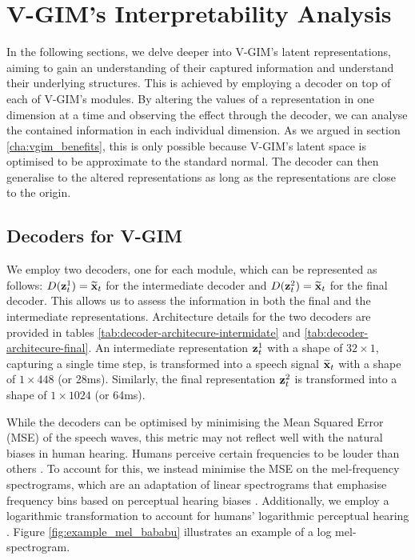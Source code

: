\section{V-GIM's Interpretability Analysis} 
	In the following sections, we delve deeper into V-GIM's latent representations, aiming to gain an understanding of their captured information and understand their underlying structures. This is achieved by employing a decoder on top of each of V-GIM's modules. By altering the values of a representation in one dimension at a time and observing the effect through the decoder, we can analyse the contained information in each individual dimension. As we argued in section \ref{cha:vgim_benefits}, this is only possible because V-GIM's latent space is optimised to be approximate to the standard normal. The decoder can then generalise to the altered representations as long as the representations are close to the origin.
	
	\subsection{Decoders for V-GIM} \label{cha:experiments_interp_analy_decoder}
		We employ two decoders, one for each module, which can be represented as follows: $D(\mathbf{z}_t^1) = \widetilde{\mathbf{x}}_t$ for the intermediate decoder and $D(\mathbf{z}_t^2) = \widetilde{\mathbf{x}}_t$ for the final decoder. This allows us to assess the information in both the final and the intermediate representations. Architecture details for the two decoders are provided in tables \ref{tab:decoder-architecure-intermidate} and \ref{tab:decoder-architecure-final}. 
		An intermediate representation $\mathbf{z}_t^1$ with a shape of $32 \times 1$, capturing a single time step, is transformed into a speech signal $\widetilde{\mathbf{x}}_t$ with a shape of $1 \times 448$ (or 28ms). Similarly,  the final representation $\mathbf{z}_t^2$ is transformed into a shape of $1 \times 1024$ (or 64ms).
			
		
			
		While the decoders can be optimised by minimising the Mean Squared Error (MSE) of the speech waves, this metric may not reflect well with the natural biases in human hearing. Humans perceive certain frequencies to be louder than others \citep{radkoffLossFunctionsAudio2021, liSupervisedSpeechEnhancement2020}. To account for this, we instead minimise the MSE on the mel-frequency spectrograms, which are an adaptation of linear spectrograms that emphasise frequency bins based on perceptual hearing biases \citep{shenNaturalTTSSynthesis2018}. Additionally, we employ a logarithmic transformation to account for humans' logarithmic perceptual hearing \citep{braunConsolidatedViewLoss2020}. Figure \ref{fig:example_mel_bababu} illustrates an example of a log mel-spectrogram. 
		
